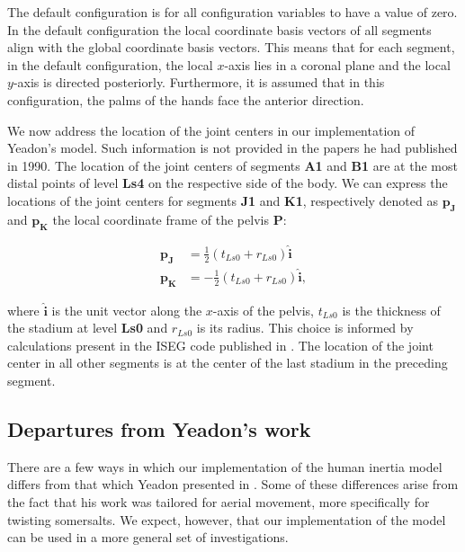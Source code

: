 \documentclass[10pt]{article}
\begin{document}
The default configuration is for all configuration variables to have a value of
zero. In the default configuration the local coordinate basis vectors of all
segments align with the global coordinate basis vectors. This means that for
each segment, in the default configuration, the local $x$-axis lies in a
coronal plane and the local $y$-axis is directed posteriorly. Furthermore, it
is assumed that in this configuration, the palms of the hands face the anterior
direction.

We now address the location of the joint centers in our implementation of
Yeadon's model. Such information is not provided in the papers he had published
in 1990. The location of the joint centers of segments \textbf{A1} and
\textbf{B1} are at the most distal points of level \textbf{Ls4} on the
respective side of the body. We can express the locations of the joint centers
for segments \textbf{J1} and \textbf{K1}, respectively denoted as
$\mathbf{p_J}$ and $\mathbf{p_K}$ the local coordinate frame of the pelvis
\textbf{P}:

\begin{align}
    \mathbf{p_J} &= \frac{1}{2} (t_{Ls0} + r_{Ls0})\mathbf{\hat{i}} \\
    \mathbf{p_K} &= -\frac{1}{2} (t_{Ls0} + r_{Ls0})\mathbf{\hat{i}},
\end{align}

where $\mathbf{\hat{i}}$ is the unit vector along the $x$-axis of the pelvis,
$t_{Ls0}$ is the thickness of the stadium at level \textbf{Ls0} and $r_{Ls0}$
is its radius. This choice is informed by calculations present in the ISEG code
published in \cite{Yeadon1984a}. The location of the joint center in all other
segments is at the center of the last stadium in the preceding segment.

\subsection*{Departures from Yeadon's work}

There are a few ways in which our implementation of the human inertia model
differs from that which Yeadon presented in \cite{Yeadon1990c, Yeadon1990f,
Yeadon1990e, Yeadon1990d}. Some of these differences arise from the fact that
his work was tailored for aerial movement, more specifically for twisting
somersalts. We expect, however, that our implementation of the model can be
used in a more general set of investigations.
\end{document}

